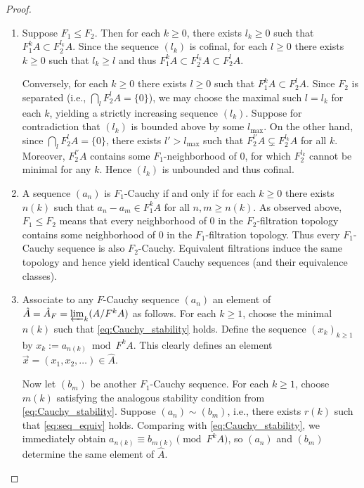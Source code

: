 \documentclass[a4paper,12pt]{amsart}
\begin{document}

\iffalse
\noindent\begin{proof}{\mbox{}\vskip 2mm}
\begin{enumerate}
    \item Suppose $F_1 \leq F_2$. Then for each $k \geq 0$, there exists $l_k \geq 0$ such that $F_1^k A \subset F_2^{l_k} A$. Since the sequence $(l_k)$ is cofinal, for each $l \geq 0$ there exists $k \geq 0$ such that $l_k \geq l$ and thus $F_1^k A \subset F_2^{l_k} A \subset F_2^l A$.

\noindent 
Conversely, for each $k \geq 0$ there exists $l \geq 0$ such that $F_1^k A \subset F_2^l A$. Since $F_2$ is separated (i.e., $\bigcap_l F_2^l A = \{0\}$), we may choose the maximal such $l = l_k$ for each $k$, yielding a strictly increasing sequence $(l_k)$. Suppose for contradiction that $(l_k)$ is bounded above by some $l_{\max}$. On the other hand, since $\bigcap_l F_2^l A = \{0\}$, there exists $l' > l_{\max}$ such that $F_2^{l'} A \subsetneq F_2^{l_k} A$ for all $k$. Moreover, $F_2^{l'} A$ contains some $F_1$-neighborhood of $0$, for which $F_2^{l_k}$ cannot be minimal for any $k$. Hence $(l_k)$ is unbounded and thus cofinal.
    \item A sequence $(a_n)$ is $F_1$-Cauchy if and only if for each $k \geq 0$ there exists $n(k)$ such that $a_n - a_m \in F_1^k A$ for all $n, m \geq n(k)$. As observed above, $F_1 \leq F_2$ means that every neighborhood of $0$ in the $F_2$-filtration topology contains some neighborhood of $0$ in the $F_1$-filtration topology. Thus every $F_1$-Cauchy sequence is also $F_2$-Cauchy. Equivalent filtrations induce the same topology and hence yield identical Cauchy sequences (and their equivalence classes).
    \item 
    Associate to any $F$-Cauchy sequence $(a_n)$ an element of $\hat{A} =\hat{A}_F= \varprojlim_k (A/F^k A)$ as follows. For each $k \ge 1$, choose the minimal $n(k)$ such that \eqref{eq:Cauchy_stability} holds. Define the sequence $(x_k)_{k \ge 1}$ by $x_k := a_{n(k)} \bmod F^k A$. This clearly defines an element $\vec{x} = (x_1, x_2, \ldots) \in \hat{A}$.

\noindent
Now let $(b_m)$ be another $F_1$-Cauchy sequence. For each $k \ge 1$, choose $m(k)$ satisfying the analogous stability condition from \eqref{eq:Cauchy_stability}. Suppose $(a_n) \sim (b_m)$, i.e., there exists $r(k)$ such that \eqref{eq:seq_equiv} holds. Comparing with \eqref{eq:Cauchy_stability}, we immediately obtain $a_{n(k)} \equiv b_{m(k)} \pmod{F^k A}$, so $(a_n)$ and $(b_m)$ determine the same element of $\hat{A}$.


\end{enumerate}
\end{proof}
\end{document}
